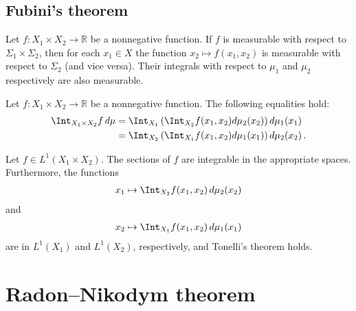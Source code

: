 \subsection{Fubini's theorem}\label{section:fubini}

    \begin{property}
        Let $f:X_1\times X_2\rightarrow\mathbb{R}$ be a nonnegative function. If $f$ is measurable with respect to $\Sigma_1\times\Sigma_2$, then for each $x_1\in X$ the function $x_2\mapsto f(x_1,x_2)$ is measurable with respect to $\Sigma_2$ (and vice versa). Their integrals with respect to $\mu_1$ and $\mu_2$ respectively are also measurable.
    \end{property}

    \begin{theorem}[Tonelli]\label{measure:tonelli_theorem}
        Let $f:X_1\times X_2\rightarrow\mathbb{R}$ be a nonnegative function. The following equalities hold:
        \begin{align}
            \Int_{X_1\times X_2}f\,d\mu &= \Int_{X_1}\left(\Int_{X_2}f(x_1,x_2)d\mu_2(x_2)\right)d\mu_1(x_1)\nonumber\\
            &= \Int_{X_2}\left(\Int_{X_1}f(x_1,x_2)d\mu_1(x_1)\right)d\mu_2(x_2)\,.
        \end{align}
    \end{theorem}

    \begin{result}[Fubini]
        Let $f\in L^1(X_1\times X_2)$. The sections of $f$ are integrable in the appropriate spaces. Furthermore, the functions
        \begin{gather}
            x_1\mapsto\Int_{X_2}f(x_1,x_2)\,d\mu_2(x_2)
        \end{gather}
        and
        \begin{gather}
            x_2\mapsto\Int_{X_1}f(x_1,x_2)\,d\mu_1(x_1)
        \end{gather}
        are in $L^1(X_1)$ and $L^1(X_2)$, respectively, and Tonelli's theorem holds.
    \end{result}

\section{Radon--Nikodym theorem}\label{section:Radon-Nikodym}

